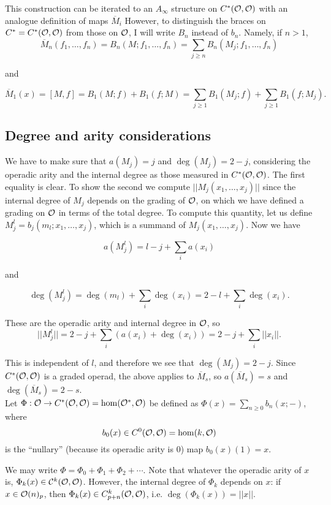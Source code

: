\documentclass[twoside]{article}
\begin{document}
This construction can be iterated to an $A_\infty$ structure on $C^*({\mathcal O},{\mathcal O})$ with an analogue definition of maps $\overline{M}_i$ %
However, to distinguish the braces on $C^*=C^*({\mathcal O},{\mathcal O})$ from those on ${\mathcal O}$, I will write $B_n$ instead of $b_n$. Namely, if $n>1$,  
$$\overline{M}_n(f_1,\dots, f_n)=B_n(M;f_1,\dots, f_n)=\sum_{j\geq n} B_n(M_j;f_1,\dots, f_n)$$

and

$$\overline{M}_1(x)=[M,f]=B_1(M;f)+B_1(f;M)=\sum_{j\geq 1}B_1(M_j;f)+\sum_{j\geq 1}B_1(f;M_j).$$ 

\subsection{Degree and arity considerations}

We have to make sure that $a(M_j)=j$ and $\deg(M_j)=2-j$, considering the operadic arity and the internal degree as those measured in $C^*({\mathcal O},{\mathcal O})$. The first equality is clear. To show the second we compute $||M_j(x_1,\dots, x_j)||$ since the internal degree of $M_j$ depends on the grading of ${\mathcal O}$, on which we have defined a grading on ${\mathcal O}$ in terms of the total degree. To compute this quantity, let us define $M_j^l=b_j(m_l;x_1,\dots, x_j)$, which is a summand of $M_j(x_1,\dots, x_j)$. Now we have 

$$a(M_j^l)=l-j+\sum_i a(x_i)$$

and

$$\deg(M_j^l)=\deg(m_l)+\sum_i\deg(x_i)=2-l+\sum_i \deg(x_i).$$ 

These are the operadic arity and internal degree in ${\mathcal O}$, so $$||M_j^l||=2-j+\sum_i(a(x_i)+\deg(x_i))=2-j+\sum_i||x_i||.$$ 

This is independent of $l$, and therefore we see that $\deg(M_j)=2-j$. Since $C^*({\mathcal O},{\mathcal O})$ is a graded operad, the above applies to $\overline{M}_s$, so $a(\overline{M}_s)=s$ and $\deg(\overline{M}_s)=2-s$.\\

Let $\Phi:{\mathcal O}\to C^*({\mathcal O},{\mathcal O})=\hom({\mathcal O}^*,{\mathcal O})$ be defined as $\Phi(x)=\sum_{n\geq 0}b_n(x;-)$, where $$b_0(x)\in C^0({\mathcal O},{\mathcal O})=\hom(k,{\mathcal O})$$ is the ``nullary'' (because its operadic arity is 0) map $b_0(x)(1)=x$.  

We may write $\Phi=\Phi_0+\Phi_1+\Phi_2+\cdots$. Note that whatever the operadic arity of $x$ is, $\Phi_k(x)\in{\mathcal C}^k({\mathcal O},{\mathcal O})$. However, the internal degree of $\Phi_k$ depends on $x$: if $x\in{\mathcal O}(n)_p$, then $\Phi_k(x)\in C^k_{p+n}({\mathcal O},{\mathcal O})$, i.e. $\deg(\Phi_k(x))=||x||$. 
\end{document}
